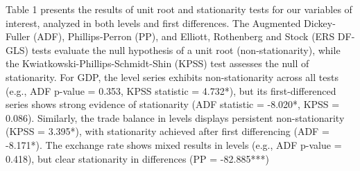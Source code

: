\documentclass[
]{article}
\begin{document}
Table 1 presents the results of unit root and stationarity tests for our variables of interest, 
analyzed in both levels and first differences. The Augmented 
Dickey-Fuller (ADF), Phillips-Perron (PP), and Elliott, Rothenberg and Stock (ERS DF-GLS) tests evaluate the 
null hypothesis of a unit root (non-stationarity), while the Kwiatkowski-Phillips-Schmidt-Shin (KPSS) test assesses 
the null of stationarity. For GDP, the level series exhibits non-stationarity 
across all tests (e.g., ADF p-value = 0.353, KPSS statistic = 4.732*), but its 
first-differenced series shows strong evidence of stationarity (ADF statistic =
-8.020*, KPSS = 0.086). Similarly, the trade balance in levels displays 
persistent non-stationarity (KPSS = 3.395*), with stationarity achieved after 
first differencing (ADF = -8.171*). The exchange rate shows mixed results in 
levels (e.g., ADF p-value = 0.418), but clear stationarity in differences
(PP = -82.885***)
\end{document}
